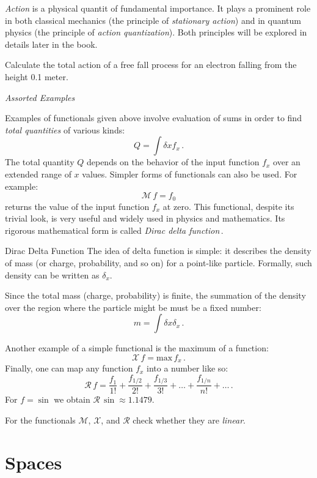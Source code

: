 \emph{Action} is a physical quantit of fundamental importance. It plays a prominent role in both classical mechanics (the principle of \emph{stationary action}) and in quantum physics (the principle of \emph{action quantization}). Both principles will be explored in details later in the book.

\begin{exercise}
	Calculate the total action of a free fall process for an electron falling from the height 0.1 meter.
\end{exercise}


\begin{flushleft}
	{\it Assorted Examples}
\end{flushleft}
Examples of functionals given above involve evaluation of sums in order to find  \emph{total quantities} of various kinds:
\[
Q = \int \delta x f_x\,.
\]
The total quantity $Q$ depends on the behavior of the input function $f_x$ over an extended range of $x$ values. Simpler forms of functionals can also be used. For example:
\[
\mathcal{M}\, f = f_0
\]
returns the value of the input function $f_x$ at zero. This functional, despite its trivial look, is very useful and widely used in physics and mathematics. Its rigorous mathematical form is called \emph{Dirac delta function}\,.
\begin{mybio}{Dirac Delta Function}
	The idea of delta function is simple: it describes the density of mass (or charge, probability, and so on) for a point-like particle. Formally, such density can be written as $\delta_x$.
	
	Since the total mass (charge, probability) is finite, the summation of the density over the region where the particle might be must be a fixed number:
	\[
	m = \int \delta x \delta_x\,.
	\]
\end{mybio}

Another example of a simple functional is the maximum of a function:
\[
\mathcal{X}\,f = \textrm{max}\,f_x\,.
\]
Finally, one can map any function $f_x$ into a number like so:
\[
\mathcal{R}\,f = \frac{f_1}{1!} + \frac{f_{1/2}}{2!} + \frac{f_{1/3}}{3!}+\ldots+\frac{f_{1/n}}{n!}+\ldots\,.
\]
For $f=\sin$ we obtain $\mathcal{R}\,\sin\approx 1.1479$.
\begin{exercise}
	For the functionals $\mathcal{M}$, $\mathcal{X}$, and $\mathcal{R}$ check whether they are \emph{linear}.
\end{exercise}

\section{Spaces}

